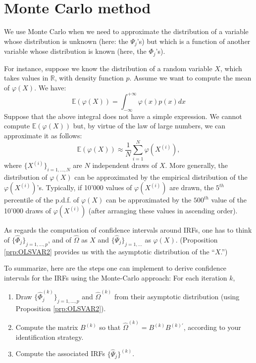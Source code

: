 \documentclass[
  12pt,
]{book}
\providecommand{\tightlist}{%
  \setlength{\itemsep}{0pt}\setlength{\parskip}{0pt}}
\theoremstyle{definition}
\theoremstyle{definition}
\theoremstyle{definition}
\theoremstyle{definition}
\theoremstyle{remark}
\begin{document}
\section{Monte Carlo method}\label{MonteCarlo}

We use Monte Carlo when we need to approximate the distribution of a variable whose distribution is unknown (here: the \(\Psi_j\)'s) but which is a function of another variable whose distribution is known (here, the \(\Phi_j\)'s).

For instance, suppose we know the distribution of a random variable \(X\), which takes values in \(\mathbb{R}\), with density function \(p\). Assume we want to compute the mean of \(\varphi(X)\). We have:
\[
\mathbb{E}(\varphi(X))=\int_{-\infty}^{+\infty}\varphi(x)p(x)dx
\]
Suppose that the above integral does not have a simple expression. We cannot compute \(\mathbb{E}(\varphi(X))\) but, by virtue of the law of large numbers, we can approximate it as follows:
\[
\mathbb{E}(\varphi(X))\approx\frac{1}{N}\sum_{i=1}^N\varphi(X^{(i)}),
\]
where \(\{X^{(i)}\}_{i=1,...,N}\) are \(N\) independent draws of \(X\). More generally, the distribution of \(\varphi(X)\) can be approximated by the empirical distribution of the \(\varphi(X^{(i)})\)'s. Typically, if 10'000 values of \(\varphi(X^{(i)})\) are drawn, the \(5^{th}\) percentile of the p.d.f. of \(\varphi(X)\) can be approximated by the \(500^{th}\) value of the 10'000 draws of \(\varphi(X^{(i)})\) (after arranging these values in ascending order).

As regards the computation of confidence intervals around IRFs, one has to think of \(\{\widehat{\Phi}_j\}_{j=1,...,p}\), and of \(\widehat{\Omega}\) as \(X\) and \(\{\widehat{\Psi}_j\}_{j=1,...}\) as \(\varphi(X)\). (Proposition \ref{prp:OLSVAR2} provides us with the asymptotic distribution of the ``\(X\).'')

To summarize, here are the steps one can implement to derive confidence intervals for the IRFs using the Monte-Carlo approach: For each iteration \(k\),

\begin{enumerate}
\def\labelenumi{\arabic{enumi}.}
\tightlist
\item
  Draw \(\{\widehat{\Phi}_j^{(k)}\}_{j=1,...,p}\) and \(\widehat{\Omega}^{(k)}\) from their asymptotic distribution (using Proposition \ref{prp:OLSVAR2}).
\item
  Compute the matrix \(B^{(k)}\) so that \(\widehat{\Omega}^{(k)}=B^{(k)}B^{(k)'}\), according to your identification strategy.
\item
  Compute the associated IRFs \(\{\widehat{\Psi}_j\}^{(k)}\).
\end{enumerate}
\end{document}
